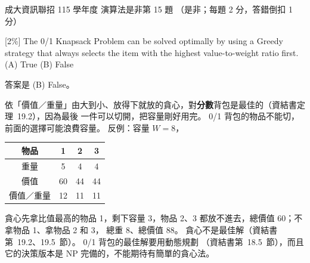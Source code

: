 \begin{pastexam}[label={px:ncku-115-prog-12}]{成大資訊聯招 115 學年度 演算法是非第 15 題}
（是非；每題 2 分，答錯倒扣 1 分）

[2\%] The 0/1 Knapsack Problem can be solved optimally by using a Greedy strategy that always selects
the item with the highest value-to-weight ratio first.\\
(A) True \qquad (B) False
\end{pastexam}

\begin{pastsoln}
答案是 (B) False。

依「價值／重量」由大到小、放得下就放的貪心，對\textbf{分數}背包是最佳的（資結書定理~19.2），因為最後
一件可以切開，把容量剛好用完。 0/1 背包的物品不能切，前面的選擇可能浪費容量。 反例：容量 $W = 8$，
\begin{center}
\begin{tabular}{cccc}
\toprule
物品 & 1 & 2 & 3 \\
\midrule
重量 & 5 & 4 & 4 \\
價值 & 60 & 44 & 44 \\
價值／重量 & 12 & 11 & 11 \\
\bottomrule
\end{tabular}
\end{center}
貪心先拿比值最高的物品 1，剩下容量 $3$，物品 2、3 都放不進去，總價值 $60$；不拿物品 1、拿物品 2 和 3，
總重 $8$、總價值 $88$。 貪心不是最佳解（資結書第~19.2、19.5~節）。 0/1 背包的最佳解要用動態規劃
（資結書第~18.5~節），而且它的決策版本是 NP 完備的，不能期待有簡單的貪心法。
\end{pastsoln}

